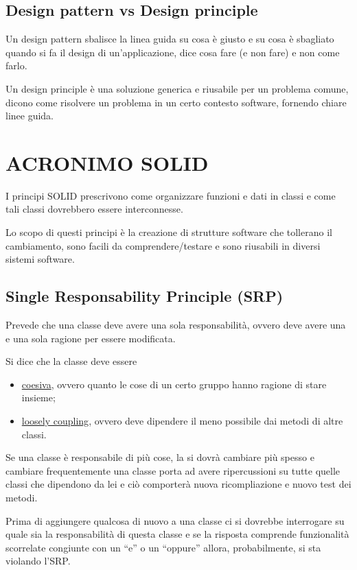 \section{Design pattern vs Design principle}

Un design pattern sbalisce la linea guida su cosa è giusto e su cosa è sbagliato quando si fa il design di un’applicazione, dice cosa fare (e non fare) e non come farlo.
\smallskip

Un design principle è una soluzione generica e riusabile per un problema comune, dicono come risolvere un problema in un certo contesto software, fornendo chiare linee 
guida.

\chapter{ACRONIMO SOLID}

I principi SOLID prescrivono come organizzare funzioni e dati in classi e come tali classi dovrebbero essere interconnesse.

Lo scopo di questi principi è la creazione di strutture software che tollerano il cambiamento, sono facili da comprendere/testare e sono riusabili in diversi sistemi 
software.

\section{Single Responsability Principle (SRP)}

Prevede che una classe deve avere una sola responsabilità, ovvero deve avere una e una sola ragione per essere modificata.

Si dice che la classe deve essere 

\begin{itemize}
  \item \underline{coesiva}, ovvero quanto le cose di un certo gruppo hanno ragione di stare insieme;
  \item \underline{loosely coupling}, ovvero deve dipendere il meno possibile dai metodi di altre classi.
\end{itemize}

Se una classe è responsabile di più cose, la si dovrà cambiare più spesso e cambiare frequentemente una classe porta ad avere ripercussioni su tutte quelle classi che 
dipendono da lei e ciò comporterà nuova ricompliazione e nuovo test dei metodi.

Prima di aggiungere qualcosa di nuovo a una classe ci si dovrebbe interrogare su quale sia la responsabilità di questa classe e se la risposta comprende funzionalità 
scorrelate congiunte con un “e” o un “oppure” allora, probabilmente, si sta violando l’SRP.

